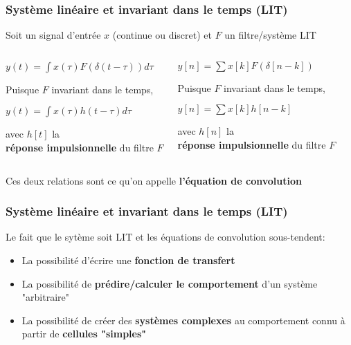 \documentclass{beamer}
\begin{document}
\begin{frame} 
\frametitle{Système linéaire et invariant dans le temps (LIT) }
Soit un signal d'entrée $x$ (continue ou discret) et $F$ un filtre/système LIT\\
\vspace{1 cm}
\begin{columns}
\column{65mm}
\begin{center}
$y(t) = \displaystyle \int x(\tau) F(\delta(t-\tau) )d\tau$\\
\vspace{0.5cm}

Puisque $F$ invariant dans le temps,\\
\vspace{0.5cm}

$y(t) = \displaystyle \int x(\tau) h(t-\tau) d\tau$\\
\vspace{0.5cm}

avec $h[t]$ la\\ \textbf{réponse impulsionnelle} du filtre $F$

\end{center}

\column{55mm}
\begin{center}

$ y[n] = \displaystyle\sum x[k]  F(\delta[n-k]) $ \\
\vspace{0.5cm}

Puisque $F$ invariant dans le temps,\\
\vspace{0.5cm}

$ y[n] = \displaystyle\sum x[k]  h[n-k] $ \\
\vspace{0.5cm}

avec $h[n]$ la\\ \textbf{réponse impulsionnelle} du filtre $F$

\end{center}
\end{columns}
\begin{block}{}
Ces deux relations sont ce qu'on appelle \textbf{l'équation de convolution}
\end{block}
\end{frame}

\begin{frame}
\frametitle{Système linéaire et invariant dans le temps (LIT)}
Le fait que le sytème soit LIT et les équations de convolution sous-tendent: \\
\vspace{1cm}
\begin{itemize}
\item La possibilité d'écrire une \textbf{fonction de transfert}
\item La possibilité de \textbf{prédire/calculer le comportement} d'un système "arbitraire"
\item La possibilité de créer des \textbf{systèmes complexes} au comportement connu à partir de \textbf{cellules "simples"}
\end{itemize}

\end{frame} 
\end{document}
